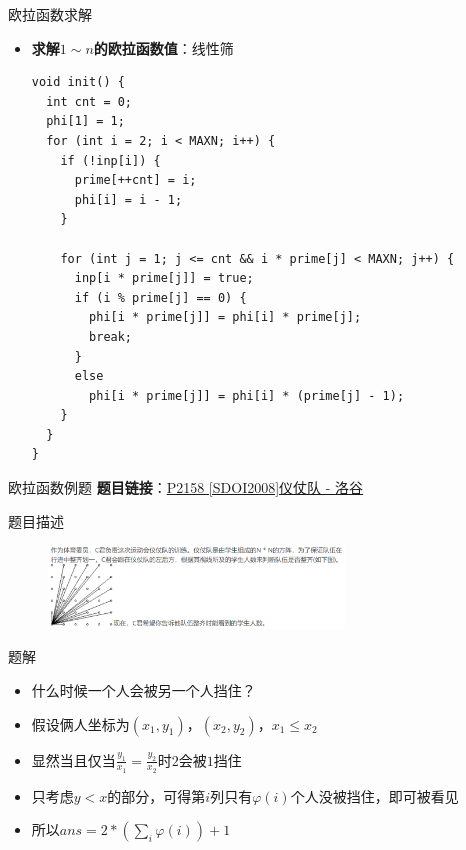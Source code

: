 \begin{frame}[fragile]{欧拉函数}{求解}
  \begin{itemize}
    \item \textbf{求解$1\sim n$的欧拉函数值}：线性筛
    \begin{lstlisting}
void init() {
  int cnt = 0;
  phi[1] = 1;
  for (int i = 2; i < MAXN; i++) {
    if (!inp[i]) {
      prime[++cnt] = i;
      phi[i] = i - 1;
    }

    for (int j = 1; j <= cnt && i * prime[j] < MAXN; j++) {
      inp[i * prime[j]] = true;
      if (i % prime[j] == 0) {
        phi[i * prime[j]] = phi[i] * prime[j];
        break;
      }
      else 
        phi[i * prime[j]] = phi[i] * (prime[j] - 1);      
    }
  }
}
    \end{lstlisting}
  \end{itemize}
\end{frame}

\begin{frame}[fragile]{欧拉函数}{例题}
  \textbf{题目链接}：\href{https://www.luogu.com.cn/problem/P2158}{P2158 [SDOI2008]仪仗队 - 洛谷}
  \begin{block}{题目描述}
    \begin{figure}
      \includegraphics[width=0.7\textwidth]{images/img1.png}
    \end{figure}
  \end{block}

  \pause 
  \begin{exampleblock}{题解}
    \begin{itemize}
      \item 什么时候一个人会被另一个人挡住？
      \pause 
      \item 假设俩人坐标为$(x_1,y_1)$，$(x_2,y_2)$，$x_1\leq x_2$
      \item 显然当且仅当$\frac{y_1}{x_1}=\frac{y_2}{x_2}$时$2$会被$1$挡住
      \pause
      \item 只考虑$y<x$的部分，可得第$i$列只有$\varphi(i)$个人没被挡住，即可被看见
      \pause 
      \item 所以$ans =2*(\sum\limits_{i}\varphi(i))+1$
    \end{itemize}
  \end{exampleblock}
\end{frame}


